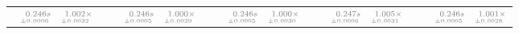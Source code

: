 \documentclass[a4paper,UKenglish]{lipics-v2016}
\begin{document}
\begin{table*}
\begin{adjustbox}{width=1.2\textwidth,center}
\begin{tabular}{rrrp{.1em}rrrp{.1em}rrrp{.1em}rrrp{.1em}rrr}
\cellcolor{black!5}{\tiny \color{gray}{p$_{8}$}:}&\cellcolor{black!5}$\substack{\mathmakebox[.7cm][r]{\color{gray}{0.246}}\color{gray}{s}\\{\mathmakebox[.7cm][r]{\scriptscriptstyle \color{gray}{\pm 0.0006}}}}$&\cellcolor{black!5}$\substack{\mathmakebox[.7cm][r]{\color{gray}{1.002}}\color{gray}{\times}\\{\mathmakebox[.7cm][r]{\scriptscriptstyle \color{gray}{\pm 0.0032}}}}$&&\cellcolor{black!5}{\tiny \color{gray}{p$_{24}$}:}&\cellcolor{black!5}$\substack{\mathmakebox[.7cm][r]{\color{gray}{0.246}}\color{gray}{s}\\{\mathmakebox[.7cm][r]{\scriptscriptstyle \color{gray}{\pm 0.0005}}}}$&\cellcolor{black!5}$\substack{\mathmakebox[.7cm][r]{\color{gray}{1.000}}\color{gray}{\times}\\{\mathmakebox[.7cm][r]{\scriptscriptstyle \color{gray}{\pm 0.0029}}}}$&&\cellcolor{black!5}{\tiny \color{gray}{p$_{40}$}:}&\cellcolor{black!5}$\substack{\mathmakebox[.7cm][r]{\color{gray}{0.246}}\color{gray}{s}\\{\mathmakebox[.7cm][r]{\scriptscriptstyle \color{gray}{\pm 0.0005}}}}$&\cellcolor{black!5}$\substack{\mathmakebox[.7cm][r]{\color{gray}{1.000}}\color{gray}{\times}\\{\mathmakebox[.7cm][r]{\scriptscriptstyle \color{gray}{\pm 0.0030}}}}$&&\cellcolor{black!5}{\tiny \color{gray}{p$_{56}$}:}&\cellcolor{black!5}$\substack{\mathmakebox[.7cm][r]{\color{gray}{0.247}}\color{gray}{s}\\{\mathmakebox[.7cm][r]{\scriptscriptstyle \color{gray}{\pm 0.0006}}}}$&\cellcolor{black!5}$\substack{\mathmakebox[.7cm][r]{\color{gray}{1.005}}\color{gray}{\times}\\{\mathmakebox[.7cm][r]{\scriptscriptstyle \color{gray}{\pm 0.0031}}}}$&&\cellcolor{black!5}{\tiny \color{gray}{p$_{72}$}:}&\cellcolor{black!5}$\substack{\mathmakebox[.7cm][r]{\color{gray}{0.246}}\color{gray}{s}\\{\mathmakebox[.7cm][r]{\scriptscriptstyle \color{gray}{\pm 0.0005}}}}$&\cellcolor{black!5}$\substack{\mathmakebox[.7cm][r]{\color{gray}{1.001}}\color{gray}{\times}\\{\mathmakebox[.7cm][r]{\scriptscriptstyle \color{gray}{\pm 0.0028}}}}$\\

\end{tabular}
\end{adjustbox}
\end{table*}
\end{document}
